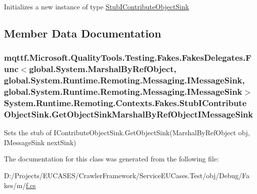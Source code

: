 Initializes a new instance of type \hyperlink{class_system_1_1_runtime_1_1_remoting_1_1_contexts_1_1_fakes_1_1_stub_i_contribute_object_sink}{Stub\-I\-Contribute\-Object\-Sink}



\subsection{Member Data Documentation}
\hypertarget{class_system_1_1_runtime_1_1_remoting_1_1_contexts_1_1_fakes_1_1_stub_i_contribute_object_sink_a35d130c63b532a0b4a33c0eeabedc659}{
\subsubsection[{Get\-Object\-Sink\-Marshal\-By\-Ref\-Object\-I\-Message\-Sink}]{\setlength{\rightskip}{0pt plus 5cm}mqttf.\-Microsoft.\-Quality\-Tools.\-Testing.\-Fakes.\-Fakes\-Delegates.\-Func$<$global.\-System.\-Marshal\-By\-Ref\-Object, global.\-System.\-Runtime.\-Remoting.\-Messaging.\-I\-Message\-Sink, global.\-System.\-Runtime.\-Remoting.\-Messaging.\-I\-Message\-Sink$>$ System.\-Runtime.\-Remoting.\-Contexts.\-Fakes.\-Stub\-I\-Contribute\-Object\-Sink.\-Get\-Object\-Sink\-Marshal\-By\-Ref\-Object\-I\-Message\-Sink}}\label{class_system_1_1_runtime_1_1_remoting_1_1_contexts_1_1_fakes_1_1_stub_i_contribute_object_sink_a35d130c63b532a0b4a33c0eeabedc659}


Sets the stub of I\-Contribute\-Object\-Sink.\-Get\-Object\-Sink(\-Marshal\-By\-Ref\-Object obj, I\-Message\-Sink next\-Sink)



The documentation for this class was generated from the following file\-:\begin{DoxyCompactItemize}
\item 
D\-:/\-Projects/\-E\-U\-C\-A\-S\-E\-S/\-Crawler\-Framework/\-Service\-E\-U\-Cases.\-Test/obj/\-Debug/\-Fakes/m/\hyperlink{m_2f_8cs}{f.\-cs}\end{DoxyCompactItemize}
